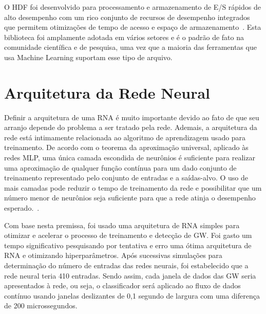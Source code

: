 O HDF foi desenvolvido para processamento e armazenamento de E/S rápidos de alto desempenho com um rico conjunto de recursos de desempenho integrados que permitem otimizações de tempo de acesso e espaço de armazenamento~\cite{hdf}. Esta biblioteca foi amplamente adotada em vários setores e é o padrão de fato na comunidade científica e de pesquisa, uma vez que a maioria das ferramentas que usa Machine Learning suportam esse tipo de arquivo.

\section{Arquitetura da Rede Neural}

Definir a arquitetura de uma RNA é muito importante devido ao fato de que seu arranjo depende do problema a ser tratado pela rede. Ademais, a arquitetura da rede está intimamente relacionada ao algoritmo de aprendizagem usado para treinamento. De acordo com o teorema da aproximação universal, aplicado às redes MLP, uma única camada escondida de neurônios é suficiente para realizar uma aproximação de qualquer função contínua para um dado conjunto de treinamento representado pelo conjunto de entradas e a saídas-alvo\cite{cybenko1989approximation, haykin2007redes}. O uso de mais camadas pode reduzir o tempo de treinamento da rede e possibilitar que um número menor de neurônios seja suficiente para que a rede atinja o desempenho esperado.~\cite{daredes}.


Com base nesta premissa, foi usado uma arquitetura de RNA simples para otimizar e acelerar o processo de treinamento e detecção de GW. Foi gasto um tempo significativo pesquisando por tentativa e erro uma ótima arquitetura de RNA e otimizando hiperparâmetros. Após sucessivas simulações para determinação do número de entradas das redes neurais, foi estabelecido que a rede neural teria 410 entradas. Sendo assim, cada janela de dados das GW seria apresentados à rede, ou seja, o classificador será aplicado ao fluxo de dados contínuo usando janelas deslizantes de 0,1 segundo de largura com uma diferença de 200 microssegundos.

